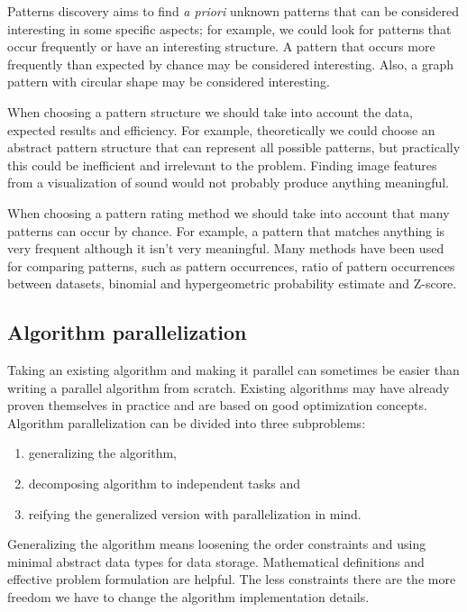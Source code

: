 Patterns discovery aims to find \emph{a priori} unknown patterns that can be considered interesting in some specific aspects; for example, we could look for patterns that occur frequently or have an interesting structure. A pattern that occurs more frequently than expected by chance may be considered interesting. Also, a graph pattern with circular shape may be considered interesting.

When choosing a pattern structure we should take into account the data, expected results and efficiency. For example, theoretically we could choose an abstract pattern structure that can represent all possible patterns, but practically this could be inefficient and irrelevant to the problem. Finding image features from a visualization of sound would not probably produce anything meaningful.

When choosing a pattern rating method we should take into account that many patterns can occur by chance. For example, a pattern that matches anything is very frequent although it isn't very meaningful. Many methods have been used for comparing patterns, such as pattern occurrences, ratio of pattern occurrences between datasets, binomial and hypergeometric probability estimate and Z-score.\insertref

\subsection{Algorithm parallelization}

Taking an existing algorithm and making it parallel can sometimes be easier than writing a parallel algorithm from scratch. Existing algorithms may have already proven themselves in practice and are based on good optimization concepts. Algorithm parallelization can be divided into three subproblems:

\begin{enumerate}
	\item generalizing the algorithm,
	\item decomposing algorithm to independent tasks and
	\item reifying the generalized version with parallelization in mind.
\end{enumerate}

Generalizing the algorithm means loosening the order constraints and using minimal abstract data types for data storage. Mathematical definitions and effective problem formulation are helpful. The less constraints there are the more freedom we have to change the algorithm implementation details.

